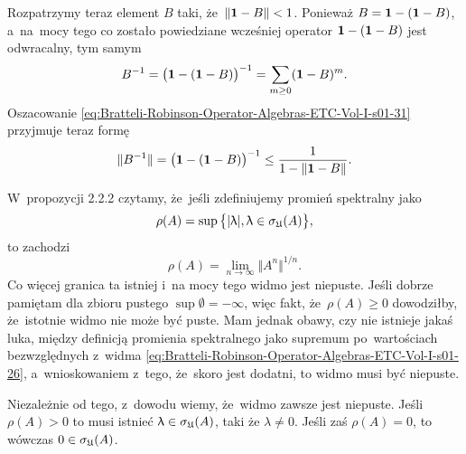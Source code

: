 \documentclass[a4paper,11pt]{article}
\begin{document}
Rozpatrzymy teraz element $B$ taki, że~$\Vert \mathbf{1} - B \Vert < 1$. Ponieważ
$B = \mathbf{1} - ( \mathbf{1} - B )$, a~na~mocy tego co zostało
powiedziane wcześniej operator $\mathbf{1} - ( \mathbf{1} - B )$ jest
odwracalny, tym samym
\begin{equation}
  \label{eq:Bratteli-Robinson-Operator-Algebras-ETC-Vol-I-s01-32}
  B^{ -1 } =
  \big( \mathbf{1} - ( \mathbf{1} - B ) \big)^{ -1 } =
  \sum_{ m \geq 0 } ( \mathbf{1} - B )^{ m }.
\end{equation}
Oszacowanie \eqref{eq:Bratteli-Robinson-Operator-Algebras-ETC-Vol-I-s01-31}
przyjmuje teraz formę
\begin{equation}
  \label{eq:Bratteli-Robinson-Operator-Algebras-ETC-Vol-I-s01-33}
  \Vert B^{ -1 } \Vert =
  \big( \mathbf{1} - ( \mathbf{1} - B ) \big)^{ -1 } \leq
  \frac{ 1 }{ 1 - \Vert \mathbf{1} - B \Vert }.
\end{equation}

\vspace{\VerSpaceFour}





\noindent
{} W~propozycji 2.2.2 czytamy, że~jeśli zdefiniujemy promień spektralny
jako
\begin{equation}
  \label{eq:Bratteli-Robinson-Operator-Algebras-ETC-Vol-I-s01-34}
  \rho( A ) =
  \sup\big\{ | \uplambda |, \uplambda \in \sigma_{ \mathfrak{U} }( A ) \big\},
\end{equation}
to zachodzi
\begin{equation}
  \label{eq:Bratteli-Robinson-Operator-Algebras-ETC-Vol-I-s01-35}
  \rho( A ) =
  \lim_{ n \to \infty } \Vert A^{ n } \Vert^{ 1 / n }.
\end{equation}
Co więcej granica ta istniej i~na mocy tego widmo jest niepuste. Jeśli
dobrze pamiętam dla zbioru pustego $\sup \emptyset = -\infty$, więc fakt,
że~$\rho( A ) \geq 0$ dowodziłby, że~istotnie widmo nie może być puste. Mam jednak
obawy, czy nie istnieje jakaś luka, między definicją promienia spektralnego
jako supremum po~wartościach bezwzględnych z~widma
\eqref{eq:Bratteli-Robinson-Operator-Algebras-ETC-Vol-I-s01-26},
a~wnioskowaniem z~tego, że~skoro jest dodatni, to widmo musi być niepuste.

Niezależnie od tego, z~dowodu wiemy, że~widmo zawsze jest niepuste. Jeśli
$\rho( A ) > 0$ to musi istnieć $\uplambda \in \sigma_{ \mathfrak{U} }( A )$, taki że $\lambda \neq 0$. Jeśli
zaś $\rho( A ) = 0$, to wówczas $0 \in \sigma_{ \mathfrak{U} }( A )$.

\vspace{\VerSpaceFour}
\end{document}
